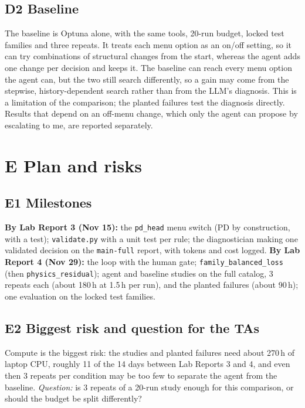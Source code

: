 \documentclass[11pt]{article}
\begin{document}
\subsection*{D2 \quad Baseline}
The baseline is Optuna alone, with the same tools, 20-run budget, locked test families and three
repeats. It treats each menu option as an on/off setting, so it can try combinations of structural
changes from the start, whereas the agent adds one change per decision and keeps it. The baseline can reach every menu option the agent can, but the two
still search differently, so a gain may come from the stepwise, history-dependent search rather
than from the LLM's diagnosis. This is a limitation of the comparison; the planted failures test
the diagnosis directly. Results that depend on an off-menu change, which only the agent can
propose by escalating to me, are reported separately.

\section*{E \quad Plan and risks}

\subsection*{E1 \quad Milestones}
\textbf{By Lab Report 3 (Nov 15):} the \texttt{pd\_head} menu switch (PD by construction, with a
test); \texttt{validate.py} with a unit test per rule; the diagnostician making one validated
decision on the \texttt{main-full} report, with tokens and cost logged.
\textbf{By Lab Report 4 (Nov 29):} the loop with the human gate; \texttt{family\_balanced\_loss}
(then \texttt{physics\_residual}); agent and baseline studies on the full catalog, 3 repeats each
(about 180\,h at 1.5\,h per run), and the planted failures (about 90\,h); one evaluation on the
locked test families.

\subsection*{E2 \quad Biggest risk and question for the TAs}
Compute is the biggest risk: the studies and planted failures need about 270\,h of laptop CPU,
roughly 11 of the 14 days between Lab Reports 3 and 4, and even then 3 repeats per condition may
be too few to separate the agent from the baseline. \emph{Question:} is 3 repeats of a 20-run study enough for this
comparison, or should the budget be split differently?
\end{document}
